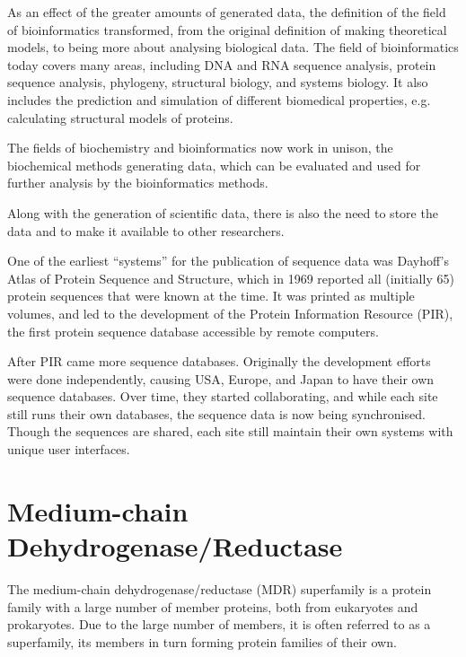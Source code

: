 \documentclass[a4paper, twoside, 12pt, openright]{report}
\begin{document}
As an effect of the greater amounts of generated data, the definition of the field of bioinformatics transformed, from the original definition of making theoretical models, to being more about analysing biological data. The field of bioinformatics today covers many areas, including DNA and RNA sequence analysis, protein sequence analysis, phylogeny, structural biology, and systems biology. It also includes the prediction and simulation of different biomedical properties, e.g. calculating structural models of proteins.

The fields of biochemistry and bioinformatics now work in unison, the biochemical methods generating data, which can be evaluated and used for further analysis by the bioinformatics methods.

Along with the generation of scientific data, there is also the need to store the data and to make it available to other researchers.

One of the earliest ``systems'' for the publication of sequence data was Dayhoff's Atlas of Protein Sequence and Structure, which in 1969 reported all (initially 65) protein sequences that were known at the time\cite{dayhoff_atlas_1969}. It was printed as multiple volumes, and led to the development of the Protein Information Resource\cite{wu_protein_2003} (PIR),  the first protein sequence database accessible by remote computers. 

After PIR came more sequence databases. Originally the development efforts were done independently, causing USA, Europe, and Japan to have their own sequence databases. Over time, they started collaborating, and while each site still runs their own databases, the sequence data is now being synchronised. Though the sequences are shared, each site still maintain their own systems with unique user interfaces.


\section{Medium-chain Dehydrogenase/Reductase}
\label{sec:mdr}

The medium-chain dehydrogenase/reductase (MDR)  superfamily is a protein family with a large number of member proteins, both from eukaryotes and prokaryotes. Due to the large number of members, it is often referred to as a superfamily, its members in turn forming protein families of their own\cite{persson_super-family_1994}.
\end{document}
